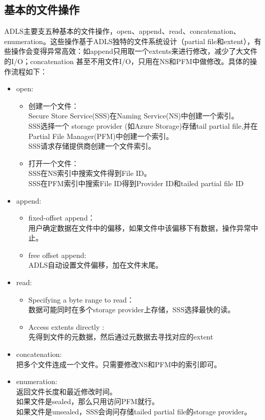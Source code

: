 \documentclass[11pt]{article}
\begin{document}
\subsection{基本的文件操作}
ADLS主要支五种基本的文件操作，open、append、read、concatenation、enumeration。这些操作基于ADLS独特的文件系统设计（partial file和extent），有些操作会变得异常高效：如append只用取一个extents来进行修改，减少了大文件的I/O；concatenation 甚至不用文件I/O，只用在NS和PFM中做修改。具体的操作流程如下：
\begin{itemize}
	\item open: 
	\begin{itemize}
		\item 创建一个文件：\\Secure Store Service(SSS)在Naming Service(NS)中创建一个索引。\\
SSS选择一个 storage provider (如Azure Storage)存储tail partial file,并在Partial File Manager(PFM)中创建一个索引。\\
SSS请求存储提供商创建一个文件索引。
		\item 打开一个文件：\\SSS在NS索引中搜索文件得到File ID。\\
SSS在PFM索引中搜索File ID得到Provider ID和tailed partial file ID
	\end{itemize}
	\item append:
	\begin{itemize}
		\item 	fixed-offset append：\\
用户确定数据在文件中的偏移，如果文件中该偏移下有数据，操作异常中止。
		\item free offset append:\\
ADLS自动设置文件偏移，加在文件末尾。
	\end{itemize}
	\item read:
	\begin{itemize}
		\item Specifying a byte range to read：\\
数据可能同时在多个storage provider上存储，SSS选择最快的读。
		\item 	Access extents directly :\\
先得到文件的元数据，然后通过元数据去寻找对应的extent

	\end{itemize}
	\item concatenation: \\
	把多个文件连成一个文件。只需要修改NS和PFM中的索引即可。
	\item enumeration: \\
	返回文件长度和最近修改时间。\\
如果文件是sealed，那么只用访问PFM就行。\\
如果文件是unsealed，SSS会询问存储tailed partial file的storage provider。\\	
\end{itemize}
\end{document}
